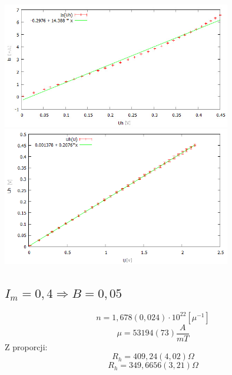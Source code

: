 \documentclass[10pt,a4paper]{article}
\begin{document}
\includegraphics[width=10cm]{23.png}
\includegraphics[width=10cm]{13.png}

\subsection{$I_m=0,4 \Rightarrow B=0,05$}
\begin{equation}
n = 1,678(0,024)\cdot 10^{22}[\mu^{-1}]
\end{equation} 
\begin{equation}
\mu = 53194(73)\frac{A}{mT}
\end{equation} 
Z proporcji:
\begin{equation}
R_h = 409,24(4,02)\Omega
\end{equation} 
\begin{equation}
R_h = 349,6656(3,21)\Omega
\end{equation} 
\end{document}
